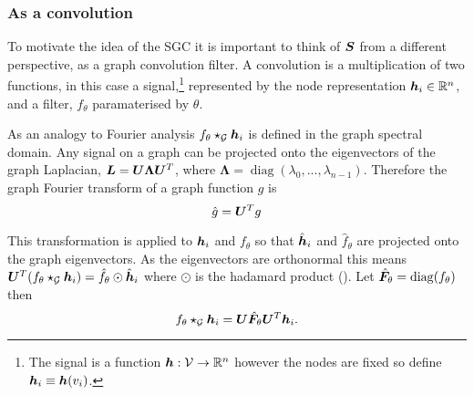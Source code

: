 \subsubsection{As a convolution}
\label{sec:conv}

To motivate the idea of the SGC it is important to think of ${\bm{S}}$ from a different perspective, as a graph convolution filter. A convolution is a multiplication of two functions, in this case a signal,\footnote{The signal is a function ${\bm{h}} : {\mathcal{V}} \to \mathbb{R}^n$ however the nodes are fixed so define ${\bm{h}}_i \equiv {\bm{h}}(v_i)$.}
represented by the node representation ${\bm{h}}_i \in \mathbb{R}^n$, and a filter, $f_\theta$ paramaterised by $\theta$.

As an analogy to Fourier analysis $f_\theta \star_{\mathcal{G}} {\bm{h}}_i$ is defined in the graph spectral domain.
Any signal on a graph can be projected onto the eigenvectors of the graph Laplacian, ${\bm{L}} = {\bm{U}}\bm{\Lambda}{\bm{U}}^T$, where $\bm{\Lambda} = \operatorname{diag}(\lambda_0, ..., \lambda_{n-1})$.
Therefore the graph Fourier transform of a graph function $g$ is
\begin{equation}
    \hat{g} = {\bm{U}}^Tg
\end{equation}

%


This transformation is applied to ${\bm{h}}_i$ and $f_\theta$ so that $\hat{{\bm{h}}}_i$ and $\hat f_\theta$ are projected onto the graph eigenvectors.
As the eigenvectors are orthonormal this means ${\bm{U}}^T(f_\theta \star_{\mathcal{G}} {\bm{h}}_i) = \hat f_\theta \odot \hat{{\bm{h}}}_i$ where $\odot$ is the hadamard product ().
Let $\hat{{\bm{F}}}_\theta = \operatorname{diag}(f_\theta)$ then
\begin{equation}
    f_\theta \star_{\mathcal{G}} {\bm{h}}_i = {\bm{U}}\hat{{\bm{F}}}_\theta{\bm{U}}^T{\bm{h}}_i.
\end{equation}

